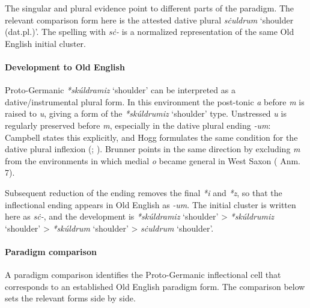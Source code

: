 \documentclass[
  british,
  a4paper,
]{article}
\providecommand{\Recon}[1]{\emph{*#1}}
\begin{document}
The singular and plural evidence point to different parts of the
paradigm. The relevant comparison form here is the attested dative
plural {\emph{sċuldrum}} `shoulder (dat.pl.)'. The spelling with
\emph{sċ-} is a normalized representation of the same Old English
initial cluster.

\paragraph{Development to Old
English}\label{development-to-old-english-130}

Proto-Germanic \Recon{skúldramiz} `shoulder' can be interpreted as a
dative/instrumental plural form. In this environment the post-tonic
\emph{a} before \emph{m} is raised to \emph{u}, giving a form of the
\Recon{skúldrumiz} `shoulder' type. Unstressed \emph{u} is regularly
preserved before \emph{m}, especially in the dative plural ending
\emph{-um}: Campbell states this explicitly, and Hogg formulates the
same condition for the dative plural inflexion
(;
). Brunner
points in the same direction by excluding \emph{m} from the environments
in which medial \emph{o} became general in West Saxon
( Anm. 7).

Subsequent reduction of the ending removes the final \emph{*i} and
\emph{*z}, so that the inflectional ending appears in Old English as
\emph{-um}. The initial cluster is written here as \emph{sċ-}, and the
development is \Recon{skúldramiz} `shoulder' \textgreater{}
\Recon{skúldrumiz} `shoulder' \textgreater{} \Recon{skúldrum} `shoulder'
\textgreater{} {\emph{sċuldrum}} `shoulder'.

\paragraph{Paradigm comparison}\label{paradigm-comparison-13}

A paradigm comparison identifies the Proto-Germanic inflectional cell
that corresponds to an established Old English paradigm form. The
comparison below sets the relevant forms side by side.
\end{document}
